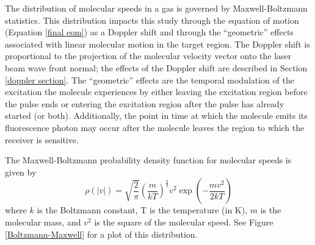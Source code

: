 The distribution of molecular speeds in a gas is governed by Maxwell-Boltzmann statistics. This distribution impacts this study through the equation of motion (Equation \ref{final eom}) as a Doppler shift and through the ``geometric'' effects associated with linear molecular motion in the target region. The Doppler shift is proportional to the projection of the molecular velocity vector onto the laser beam wave front normal; the effects of the Doppler shift are described in Section \ref{doppler section}. The ``geometric'' effects are the temporal modulation of the excitation the molecule experiences by either leaving the excitation region before the pulse ends or entering the excitation region after the pulse has already started (or both). Additionally, the point in time at which the molecule emits its fluorescence photon may occur after the molecule leaves the region to which the receiver is sensitive.

The Maxwell-Boltzmann probability density function for molecular speeds is given by \cite{Serway:1990a}
\begin{equation}
\rho(|v|)
=
\sqrt{\frac{2}{\pi}}
\left(\frac{m}{kT}\right)^{\frac{3}{2}}
v^2
\exp{\left(
-\frac{m v^2}{2 k T}
\right)}
\end{equation}
where $k$ is the Boltzmann constant, T is the temperature (in K), $m$ is the molecular mass, and $v^2$ is the square of the molecular speed. See Figure \ref{Boltzmann-Maxwell} for a plot of this distribution.


